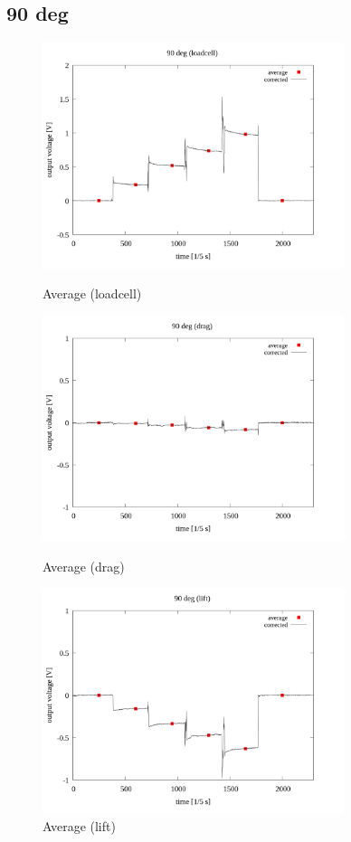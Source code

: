 \documentclass[twocolumn,a4j]{jsarticle}
\begin{document}
\newpage
\subsection{90 deg}
\begin{figure}[htbp]
    \footnotesize
    \begin{center}
        \includegraphics[width=88mm]{../images/average/90_loadcell_average.png}
        \caption{Average (loadcell)}
        \includegraphics[width=88mm]{../images/average/90_drag_average.png}
        \caption{Average (drag)}
        \includegraphics[width=88mm]{../images/average/90_lift_average.png}
        \caption{Average (lift)}
    \end{center}
\end{figure}
\end{document}
